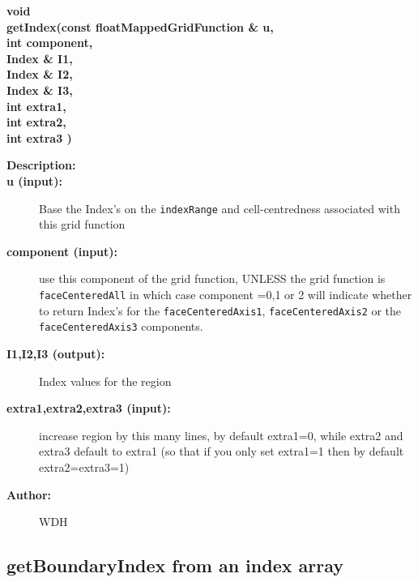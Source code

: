  
\begin{flushleft} \textbf{%
void  \\ 
\settowidth{\OGgetIndexIncludeArgIndent}{getIndex(}%
getIndex(const floatMappedGridFunction \& u, \\ 
\hspace{\OGgetIndexIncludeArgIndent}int component, \\ 
\hspace{\OGgetIndexIncludeArgIndent}Index \& I1, \\ 
\hspace{\OGgetIndexIncludeArgIndent}Index \& I2, \\ 
\hspace{\OGgetIndexIncludeArgIndent}Index \& I3, \\ 
\hspace{\OGgetIndexIncludeArgIndent}int extra1,\\ 
\hspace{\OGgetIndexIncludeArgIndent}int extra2,\\ 
\hspace{\OGgetIndexIncludeArgIndent}int extra3 )
}\end{flushleft}
\begin{description}
\item[{\bf Description:}] 
\item[{\bf u (input):}]  Base the Index's on the {\tt indexRange} and cell-centredness associated   
     with this grid function
\item[{\bf component (input):}]  use this component of the grid function, UNLESS the grid function 
    is {\tt faceCenteredAll} in which case component =0,1 or 2 will indicate whether to return
   Index's for the {\tt faceCenteredAxis1}, {\tt faceCenteredAxis2} or the {\tt faceCenteredAxis3} components.
\item[{\bf I1,I2,I3 (output):}]  Index values for the region
\item[{\bf extra1,extra2,extra3 (input):}]  increase region by this many lines, by default extra1=0, while 
                         extra2 and extra3 default to extra1 (so that if you only set extra1=1
                         then by default extra2=extra3=1)
\item[{\bf Author:}]  WDH
\end{description}
\subsection{getBoundaryIndex from an index array}
 
